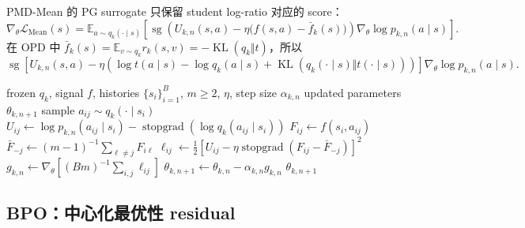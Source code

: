 \documentclass[lang=cn,scheme=chinese,openany]{../book/elegantbook}
\begin{document}
PMD-Mean 的 PG surrogate 只保留 student log-ratio 对应的 score：
\begin{equation}
\label{eq:ch2-mean-pg}
\nabla_\theta\mathcal L_{\mathrm{Mean}}(s)
=\mathbb E_{a\sim q_k(\cdot\mid s)}\left[
\operatorname{sg}\!\left(U_{k,n}(s,a)-\eta\bigl(f(s,a)-\bar f_k(s)\bigr)\right)
\nabla_\theta\log p_{k,n}(a\mid s)\right].
\end{equation}
在 OPD 中 $\bar f_k(s)=\mathbb E_{v\sim q_k}r_k(s,v)=-\operatorname{KL}( q_k\Vert t)$，所以
\begin{equation}
\label{eq:ch2-mean-opd-pg}
\operatorname{sg}\!\left[
U_{k,n}(s,a)-\eta\left(\log t(a\mid s)-\log q_k(a\mid s)
+\operatorname{KL}( q_k(\cdot\mid s)\Vert t(\cdot\mid s))\right)
\right]\nabla_\theta\log p_{k,n}(a\mid s).
\end{equation}

\begin{algorithm}[ht]
\caption{PMD-Mean inner update\\{\small\textit{Semantics: 中心化 target 在指数归一化集合上的投影}}}
\begin{algorithmic}[1]
\Require frozen $ q_k$, signal $f$, histories $\{s_i\}_{i=1}^{B}$, $m\ge2$, $\eta$, step size $\alpha_{k,n}$
\Ensure updated parameters $\theta_{k,n+1}$
        \State sample $a_{ij}\sim q_k(\cdot\mid s_i)$
        \State $U_{ij}\gets\log p_{k,n}(a_{ij}\mid s_i)-\operatorname{stopgrad}(\log q_k(a_{ij}\mid s_i))$
        \State $F_{ij}\gets f(s_i,a_{ij})$
    \EndFor
        \State $\bar F_{-j}\gets(m-1)^{-1}\sum_{\ell\ne j}F_{i\ell}$
        \State $\ell_{ij}\gets\frac12[U_{ij}-\eta\operatorname{stopgrad}(F_{ij}-\bar F_{-j})]^2$
    \EndFor
\EndFor
\State $g_{k,n}\gets\nabla_\theta[(Bm)^{-1}\sum_{i,j}\ell_{ij}]$
\State $\theta_{k,n+1}\gets\theta_{k,n}-\alpha_{k,n}g_{k,n}$
\State \Return $\theta_{k,n+1}$
\end{algorithmic}
\end{algorithm}



\subsection{BPO：中心化最优性 residual}
\label{sec:ch2-bpo}
\end{document}
